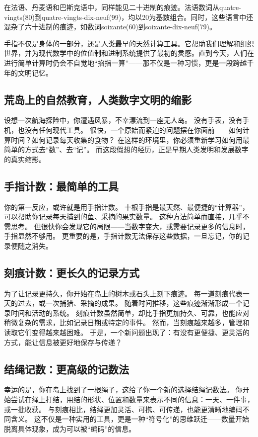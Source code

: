 在法语、丹麦语和巴斯克语中，同样能见二十进制的痕迹。法语数词从quatre-vingts(80)​到quatre-vingts-dix-neuf(99)，均以20为基数组合。同时，这些语言中还混杂了六十进制的痕迹，如数词soixante(60)到soixante-dix-neuf(79)。

手指不仅是身体的一部分，还是人类最早的天然计算工具。它帮助我们理解和组织世界，并为现代数学中的位值制和进制系统提供了最初的灵感。直到今天，人们在进行简单计算时仍会不自觉地“掐指一算”——那不仅是一种习惯，更是一段跨越千年的文明记忆。

\subsection{荒岛上的自然教育，人类数字文明的缩影}

设想一次航海探险中，你遭遇风暴，不幸漂流到一座无人岛。  
没有手表，没有手机，也没有任何现代工具。  
很快，一个原始而紧迫的问题摆在你面前——如何计算时间？如何记录每天收集的食物？  
在这样的环境里，你必须重新学习如何用最简单的方式去“数”、去“记”。  
而这段假想的经历，正是早期人类发明和发展数字的真实缩影。

\subsection*{手指计数：最简单的工具}
你的第一反应，或许就是用手指计数。  
十根手指是最天然、最便捷的“计算器”，可以帮助你记录每天捕到的鱼、采摘的果实数量。  
这种方法简单而直接，几乎不需思考。  
但很快你会发现它的局限——当数字变大，或需要记录更多的信息时，手指显然不够用。  
更重要的是，手指计数无法保存这些数据，一旦忘记，你的记录便随之消失。

\subsection*{刻痕计数：更长久的记录方式}

为了让记录更持久，你开始在岛上的树木或石头上刻下痕迹。  
每一道刻痕代表一天的过去，或一次捕猎、采摘的成果。  
随着时间推移，这些痕迹渐渐形成一个记录时间和活动的系统。  
刻痕计数虽然简单，却比手指更加持久、可靠，也能应对稍微复杂的需求，比如记录日期或特定的事件。  
然而，当刻痕越来越多，管理和读取它们变得越来越困难。  
于是，一个新问题出现了：有没有更便捷、更灵活的方式，能让信息被更好地保存与传递？  

\subsection*{结绳记数：更高级的记数法}
幸运的是，你在岛上找到了一根绳子，这给了你一个新的选择结绳记数法。  
你开始尝试在绳上打结，用结的形状、位置和数量来表示不同的信息：一天、一件事，或一批收获。  
与刻痕相比，结绳更加灵活、可携、可传递，也能更清晰地编码不同含义。  
这不仅是一种实用的工具，更是一种“符号化”的思维跃迁——数量开始脱离具体现象，成为可以被“编码”的信息。  

